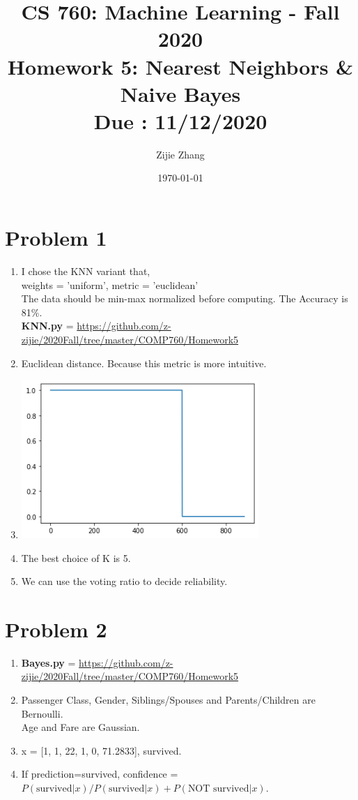 \documentclass{article}
\title{CS 760: Machine Learning - Fall 2020\\
        {\Large \textbf{Homework 5: Nearest Neighbors \& Naive Bayes}}\\
        {\normalsize \textbf{Due : 11/12/2020}}
    }
\author{Zijie Zhang}
\date{\today}
\begin{document}
    \maketitle
    \section*{Problem 1}
    \begin{enumerate}[label=(\alph*)]
        \item I chose the KNN variant that,\\
            weights = 'uniform', metric = 'euclidean'\\
            The data should be min-max normalized before computing.
            The Accuracy is 81\%.\\
            \textbf{KNN.py} = \url{https://github.com/z-zijie/2020Fall/tree/master/COMP760/Homework5}
        \item Euclidean distance. Because this metric is more intuitive.
        \item \indent
        \begin{center}
            \includegraphics[width=9cm]{1c.png}
        \end{center}
        \item The best choice of K is 5.
        \item We can use the voting ratio to decide reliability.
    \end{enumerate}
    

    \section*{Problem 2}
    \begin{enumerate}[label=(\alph*)]
        \item \textbf{Bayes.py} = \url{https://github.com/z-zijie/2020Fall/tree/master/COMP760/Homework5}
        \item Passenger Class, Gender, Siblings/Spouses and Parents/Children are Bernoulli.\\
        Age and Fare are Gaussian.
        \item x = [1, 1, 22, 1, 0, 71.2833], survived.
        \item If prediction=survived, confidence = $P(\text{survived}|x)/P(\text{survived}|x) + P(\text{NOT survived}|x)$.
    \end{enumerate}
\end{document}
